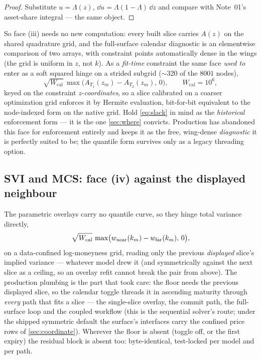 \documentclass[11pt]{article}
\newcommand{\Lo}{\Lambda}
\begin{document}
\begin{proof}
Substitute $u=\Lo(z)$, $\dd u=\Lo(1-\Lo)\,\dd z$ and compare with
Note~01's asset-share integral --- the same object.
\end{proof}

So face (iii) needs no new computation: every built slice carries
$A(z)$ on the shared quadrature grid, and the full-surface calendar
diagnostic is an elementwise comparison of two arrays, with constraint
points automatically dense in the wings (the grid is uniform in $z$,
not $k$).  As a \emph{fit-time} constraint the same face \emph{used to}
enter as a soft squared hinge on a strided subgrid ($\sim$320 of the
$8001$ nodes),
\begin{equation}
\sqrt{W_{\mathrm{cal}}}\,
\max\!\big(A_{T_1}(z_m)-A_{T_2}(z_m),\,0\big),
\qquad W_{\mathrm{cal}}=10^{6},
\label{eq:slack}
\end{equation}
keyed on the constraint $z$-\emph{coordinates}, so a slice calibrated
on a coarser optimization grid enforces it by Hermite evaluation,
bit-for-bit equivalent to the node-indexed form on the native grid.
Hold \eqref{eq:slack} in mind as the \emph{historical} enforcement form
--- it is the one \cref{sec:where} convicts.  Production has abandoned
this face for enforcement entirely and keeps it as the free, wing-dense
\emph{diagnostic} it is perfectly suited to be; the quantile form
survives only as a legacy threading option.

\subsection{SVI and MCS: face (iv) against the displayed neighbour}

The parametric overlays carry no quantile curve, so they hinge total
variance directly,
\begin{equation}
\sqrt{W_{\mathrm{cal}}}\,
\max\!\big(w_{\mathrm{near}}(k_m)-w_{\mathrm{far}}(k_m),\,0\big),
\label{eq:wfloor}
\end{equation}
on a data-confined log-moneyness grid, reading only the previous
\emph{displayed} slice's implied variance --- whatever model drew it
(and symmetrically against the next slice as a ceiling, so an overlay
refit cannot break the pair from above).  The production plumbing is
the part that took care: the floor needs the previous displayed slice,
so the calendar toggle threads it in ascending maturity through
\emph{every} path that fits a slice --- the single-slice overlay, the
commit path, the full-surface loop and the coupled workflow (this is the
sequential solver's route; under the shipped symmetric default the
surface's interfaces carry the confined price rows of
\cref{sec:coordinate}).  Wherever
the floor is absent (toggle off, or the first expiry) the residual
block is absent too: byte-identical, test-locked per model and per
path.
\end{document}
